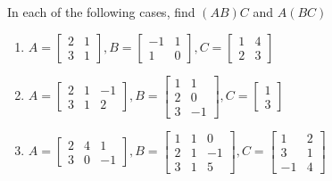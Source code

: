 \begin{exercise}
    In each of the following cases, find $(AB)C$ and $A(BC)$
    \begin{enumerate}[label={(\alph*)}]
        \item $A = \begin{bmatrix}2 & 1 \\ 3 & 1\end{bmatrix}, B = \begin{bmatrix}-1 & 1 \\ 1 & 0\end{bmatrix}, C = \begin{bmatrix}1 & 4 \\ 2 & 3\end{bmatrix}$
        \item $A = \begin{bmatrix}2 & 1 & -1 \\ 3 & 1 & 2\end{bmatrix}, B = \begin{bmatrix}1 & 1 \\ 2 & 0 \\ 3 & -1\end{bmatrix}, C = \begin{bmatrix}1 \\ 3\end{bmatrix}$
        \item $A = \begin{bmatrix}2 & 4 & 1 \\ 3 & 0 & -1\end{bmatrix}, B = \begin{bmatrix}1 & 1 & 0 \\ 2 & 1 & -1 \\ 3 & 1 & 5\end{bmatrix}, C = \begin{bmatrix}1 & 2 \\ 3 & 1 \\ -1 & 4\end{bmatrix}$
    \end{enumerate}
\end{exercise}


